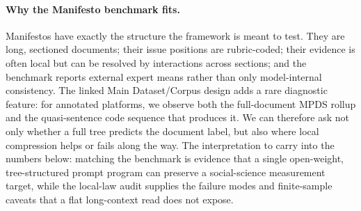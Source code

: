 \paragraph{Why the Manifesto benchmark fits.}
Manifestos have exactly the structure the framework is meant to test.
They are long, sectioned documents; their issue positions are rubric-coded;
their evidence is often local but can be resolved by interactions across
sections; and the benchmark reports external expert means rather than only
model-internal consistency. The linked Main Dataset/Corpus design adds a
rare diagnostic feature: for annotated platforms, we observe both the
full-document MPDS rollup and the quasi-sentence code sequence that
produces it. We can therefore ask not only whether a full tree predicts
the document label, but also where local compression helps or fails along
the way. The interpretation to carry into the numbers below: matching
the benchmark is evidence that a single open-weight, tree-structured
prompt program can preserve a social-science measurement target, while
the local-law audit supplies the failure modes and finite-sample caveats
that a flat long-context read does not expose.
